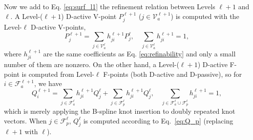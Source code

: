 \documentclass[graybox]{svmult}
\begin{document}
Now we add to Eq. \eqref{eq:surf_l1} the refinement relation between Levels $\ell+1$ and $\ell$. A Level-($\ell+1$) D-active V-point $P_j^{\ell+1}$ ($j\in\mathcal{V}_a^{\ell+1}$)  is computed with the Level-$\ell$ D-active V-points,
\begin{equation}
P_j^{\ell+1} = \sum_{j\in\mathcal{V}_a^\ell} h_{ji}^{\ell+1} P_j^{\ell},\quad \sum_{j\in\mathcal{V}_a^\ell} h_{ji}^{\ell+1} =1,
\label{eq:P_a}
\end{equation}
where $h_{ji}^{\ell+1}$ are the same coefficients as Eq. \eqref{eq:refinability} and only a small number of them are nonzero.
On the other hand, a Level-($\ell+1$) D-active F-point is computed from Level-$\ell$ F-points (both D-active and D-passive), so for $i\in\mathcal{F}_a^{\ell+1}$, we have
\begin{equation}
Q_i^{\ell+1} = \sum_{j\in\mathcal{F}_a^{\ell}} h_{ji}^{\ell+1} Q_j^{\ell} + \sum_{j\in\mathcal{F}_p^{\ell}} h_{ji}^{\ell+1} Q_j^{\ell}, \quad \sum_{j\in\mathcal{F}_a^{\ell}\cup\mathcal{F}_p^{\ell}} h_{ji}^{\ell+1} = 1,
\label{eq:Q_a}
\end{equation}
which is merely applying the B-spline knot insertion to doubly repeated knot vectors. When $j\in\mathcal{F}_p^\ell$, $Q_j^\ell$ is computed according to Eq.~\eqref{eq:Q_p} (replacing $\ell+1$ with $\ell$). 
\end{document}

